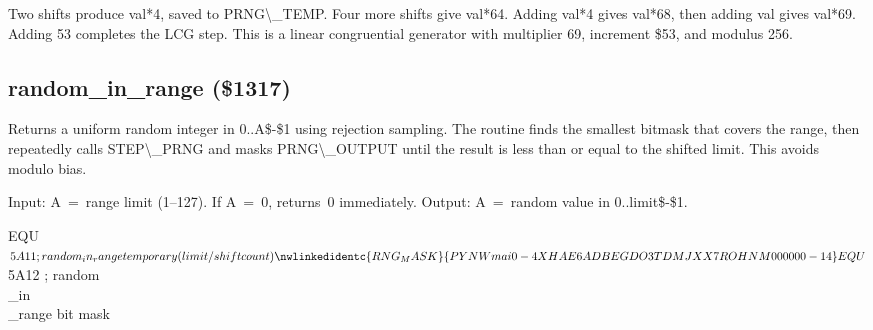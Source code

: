 \documentclass[10pt]{report}
\begin{document}
Two shifts produce {\Tt{}val*4\nwendquote}, saved to {\Tt{}PRNG{\textbackslash}{\_}TEMP\nwendquote}.  Four more shifts give
{\Tt{}val*64\nwendquote}.  Adding {\Tt{}val*4\nwendquote} gives {\Tt{}val*68\nwendquote}, then adding {\Tt{}val\nwendquote} gives
{\Tt{}val*69\nwendquote}.  Adding {\Tt{}{\textbackslash}{\$}53\nwendquote} completes the LCG step.  This is a linear
congruential generator with multiplier 69, increment \$53, and modulus 256.

\subsection{random\_in\_range (\$1317)}

Returns a uniform random integer in {\Tt{}0..A{\$}-{\$}1\nwendquote} using rejection sampling.
The routine finds the smallest bitmask that covers the range, then repeatedly
calls {\Tt{}STEP{\textbackslash}{\_}PRNG\nwendquote} and masks {\Tt{}PRNG{\textbackslash}{\_}OUTPUT\nwendquote} until the result is less than
or equal to the shifted limit.  This avoids modulo bias.

Input: A~=~range limit (1--127).  If A~=~0, returns~0 immediately.
Output: A~=~random value in {\Tt{}0..limit{\$}-{\$}1\nwendquote}.

\nwenddocs{}\plusendmoddef\nwstartdeflinemarkup{}\nwenddeflinemarkup
{}           EQU     $5A11   ; random\\_in\\_range temporary (limit/shift count)
\nwlinkedidentc{RNG_MASK}{PYNWmai0-4XHAE6ADBEGDO3TDMJXX7ROHNM000000-14}            EQU     $5A12   ; random\\_in\\_range bit mask
\eatline
{}\nwendcode{}\nwdocspar
\end{document}
